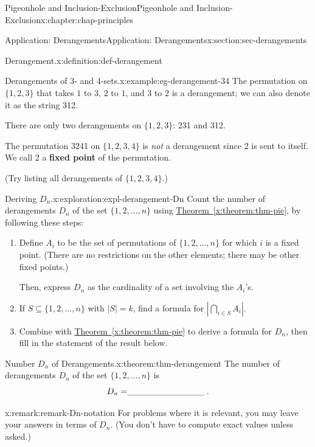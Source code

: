 \documentclass[oneside,10pt,]{book}
\newcommand{\xreffont}{\relax}
\newcommand{\terminology}[1]{\textbf{#1}}
\newcommand{\fillin}[1]{\leavevmode\leaders\vrule height -1.2pt depth 1.5pt \hskip #1em minus #1em \null}
\numberwithin{equation}{section}
\begin{document}
\begin{chapterptx}{Pigeonhole and Inclusion-Exclusion}{}{Pigeonhole and Inclusion-Exclusion}{}{}{x:chapter:chap-principles}
\begin{sectionptx}{Application: Derangements}{}{Application: Derangements}{}{}{x:section:sec-derangements}
\begin{definition}{Derangement.}{x:definition:def-derangement}
\end{definition}
\begin{example}{Derangements of 3- and 4-sets.}{x:example:eg-derangement-34}%
The permutation on \(\{1,2,3\}\) that takes \(1\) to \(3\), \(2\) to \(1\), and \(3\) to \(2\) is a derangement; we can also denote it as the string 312.%
\par
There are only two derangements on \(\{1,2,3\}\): 231 and 312.%
\par
The permutation 3241 on \(\{1,2,3,4\}\) is \emph{not} a derangement since 2 is sent to itself. We call 2 a \terminology{fixed point} of the permutation.%
\par
(Try listing all derangements of \(\{1,2,3,4\}\).)%
\end{example}
\begin{exploration}{Deriving \(D_n\).}{x:exploration:expl-derangement-Dn}%
Count the number of derangements \(D_n\) of the set \(\{1,2,\ldots,n\}\) using \hyperref[x:theorem:thm-pie]{Theorem~{\xreffont\ref{x:theorem:thm-pie}}}, by following these steps: \label{g:notation:id429016}%
\begin{enumerate}[font=\bfseries,label=(\alph*),ref=\alph*]
\item{}Define \(A_i\) to be the set of permutations of \(\{1,2,\ldots,n\}\) for which \(i\) is a fixed point. (There are no restrictions on the other elements; there may be other fixed points.)%
\par
Then, express \(D_n\) as the cardinality of a set involving the \(A_i\)'s.%
\item{}If \(S \subseteq \{1,2,\ldots,n\}\) with \(|S| = k\), find a formula for \(\left|\displaystyle\bigcap_{i \in S} A_i\right|\).%
\item{}Combine with \hyperref[x:theorem:thm-pie]{Theorem~{\xreffont\ref{x:theorem:thm-pie}}} to derive a formula for \(D_n\), then fill in the statement of the result below.%
\end{enumerate}
\end{exploration}
\begin{theorem}{Number \(D_n\) of Derangements.}{}{x:theorem:thm-derangement}%
The number of derangements \(D_n\) of the set \(\{1,2,\ldots,n\}\) is%
\begin{equation*}
D_n = \fillin{9.090909090909092}\text{.}
\end{equation*}
%
\end{theorem}
\begin{remark}{}{x:remark:remark-Dn-notation}%
For problems where it is relevant, you may leave your answers in terms of \(D_n\). (You don't have to compute exact values unless asked.)%

\end{remark}
\end{sectionptx}
\end{chapterptx}
\end{document}
